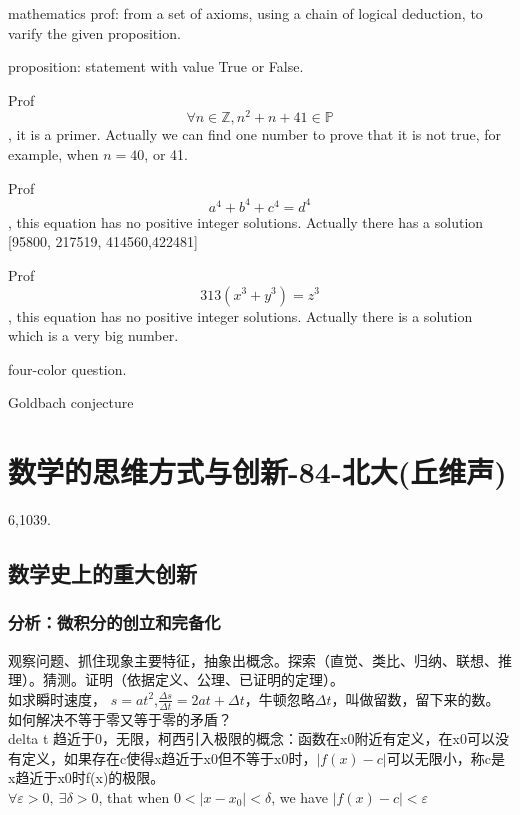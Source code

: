 \documentclass[UTF8]{../09-Mathematics}
\begin{document}
mathematics prof: from a set of axioms, using a chain of logical deduction, to varify the given proposition.

proposition: statement with value True or False.


\begin{proposition}
    Prof
    $$  \forall n \in \mathbb{Z}, n^2 + n + 41 \in \mathbb{P} $$
    , it is a primer. Actually we can find one number to prove that it is not true, for example, when $n = 40$, or 41.
\end{proposition}

\begin{proposition}
    Prof
    $$  a^4 + b^4 + c^4  = d^4$$, this equation has no positive integer solutions. Actually there has a solution [95800, 217519, 414560,422481]
\end{proposition}

\begin{proposition}
    Prof
    $$  313(x^3 + y^3) = z^3$$, this equation has no positive integer solutions. Actually there is a solution which is a very big number.
\end{proposition}


four-color question.   

Goldbach conjecture

\section{数学的思维方式与创新-84-北大(丘维声)}
6,1039. 

\subsection{数学史上的重大创新}


\subsubsection{分析：微积分的创立和完备化}
观察问题、抓住现象主要特征，抽象出概念。探索（直觉、类比、归纳、联想、推理）。猜测。证明（依据定义、公理、已证明的定理）。\\



如求瞬时速度， $s=at^2$,$\frac{\Delta s}{\Delta t}=2at+\Delta t$，牛顿忽略$\Delta t$，叫做留数，留下来的数。\\
如何解决不等于零又等于零的矛盾？\\
delta t 趋近于0，无限，柯西引入极限的概念：函数在x0附近有定义，在x0可以没有定义，如果存在c使得x趋近于x0但不等于x0时，$|f(x)-c|$可以无限小，称c是x趋近于x0时f(x)的极限。\\
$\forall \varepsilon >0,\ \exists \delta >0$, that when $0<|x-x_0|<\delta$, we have $|f(x)-c|<\varepsilon$
\end{document}
